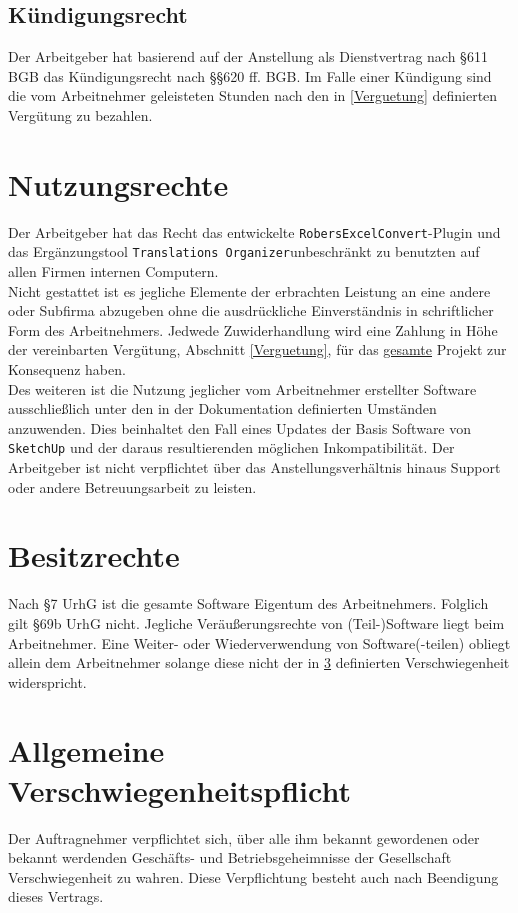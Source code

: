 \documentclass[a4paper,12pt]{article}
\newcommand{\robersexcelconvert}{\texttt{RobersExcelConvert}\xspace}
\newcommand{\assisttool}{\texttt{Translations Organizer}}
\newcommand{\sketchup}{\texttt{SketchUp}\xspace}
\begin{document}
		\subsection{Kündigungsrecht} \label{Kuendigungsrecht}
			Der Arbeitgeber hat basierend auf der Anstellung als Dienstvertrag nach §611 BGB das Kündigungsrecht nach §§620 ff. BGB. Im Falle einer Kündigung sind die vom Arbeitnehmer geleisteten Stunden nach den in \ref{Verguetung} definierten Vergütung zu bezahlen.
	\section{Nutzungsrechte} \label{Nutzungsrechte}
		Der Arbeitgeber hat das Recht das entwickelte \robersexcelconvert-Plugin und das Ergänzungstool \assisttool unbeschränkt zu benutzten auf allen Firmen internen Computern. \\
		Nicht gestattet ist es jegliche Elemente der erbrachten Leistung an eine andere oder Subfirma abzugeben ohne die ausdrückliche Einverständnis in schriftlicher Form des Arbeitnehmers. Jedwede Zuwiderhandlung wird eine Zahlung in Höhe der vereinbarten Vergütung, Abschnitt \ref{Verguetung}, für das \underline{gesamte} Projekt zur Konsequenz haben.\\
		Des weiteren ist die Nutzung jeglicher vom Arbeitnehmer erstellter Software ausschließlich unter den  in der Dokumentation definierten Umständen anzuwenden. Dies beinhaltet den Fall eines Updates der Basis Software von \sketchup und der daraus resultierenden möglichen Inkompatibilität. Der Arbeitgeber ist nicht verpflichtet über das Anstellungsverhältnis hinaus Support oder andere Betreuungsarbeit zu leisten.
	\section{Besitzrechte} \label{Besitzrechte}
		Nach §7 UrhG ist die gesamte Software Eigentum des Arbeitnehmers. Folglich gilt §69b UrhG nicht. Jegliche Veräußerungsrechte von (Teil-)Software liegt beim Arbeitnehmer. Eine Weiter- oder Wiederverwendung von Software(-teilen) obliegt allein dem Arbeitnehmer solange diese nicht der in \ref{Verschwiegenheitsregel} definierten Verschwiegenheit widerspricht.
	\section{Allgemeine Verschwiegenheitspflicht} \label{Verschwiegenheitsregel}
		Der Auftragnehmer verpflichtet sich, über alle ihm bekannt gewordenen oder bekannt werdenden Geschäfts- und Betriebsgeheimnisse der Gesellschaft Verschwiegenheit zu wahren. Diese Verpflichtung besteht auch nach Beendigung dieses Vertrags.\\		
\end{document}
